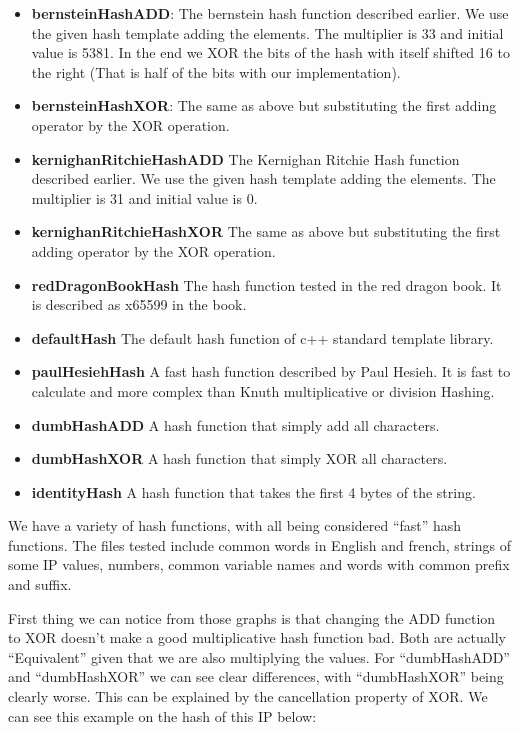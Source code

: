 \begin{itemize}
\item \textbf{bernsteinHashADD}: The bernstein hash function described earlier. We use the given hash template adding the elements. The multiplier is 33 and initial value is 5381. In the end we XOR the bits of the hash with itself shifted 16 to the right (That is half of the bits with our implementation).
  
\item \textbf{bernsteinHashXOR}: The same as above but substituting the first adding operator by the XOR operation.

\item \textbf{kernighanRitchieHashADD} The Kernighan Ritchie Hash function described earlier. We use the given hash template adding the elements. The multiplier is 31 and initial value is 0.

\item \textbf{kernighanRitchieHashXOR} The same as above but substituting the first adding operator by the XOR operation.

\item \textbf{redDragonBookHash} The hash function tested in the red dragon book. It is described as x65599 in the book.

\item \textbf{defaultHash} The default hash function of c++ standard template library.

\item \textbf{paulHesiehHash} A fast hash function described by Paul Hesieh. It is fast to calculate and more complex than Knuth multiplicative or division Hashing.
  
\item \textbf{dumbHashADD} A hash function that simply add all characters.

\item \textbf{dumbHashXOR} A hash function that simply XOR all characters.

\item \textbf{identityHash} A hash function that takes the first 4 bytes of the string.  
\end{itemize}

We have a variety of hash functions, with all being considered ``fast'' hash functions. The files tested include common words in English and french, strings of some IP values, numbers, common variable names and words with common prefix and suffix.

First thing we can notice from those graphs is that changing the ADD function to XOR doesn't make a good multiplicative hash function bad. Both are actually ``Equivalent'' given that we are also multiplying the values. For ``dumbHashADD'' and ``dumbHashXOR'' we can see clear differences, with ``dumbHashXOR'' being clearly worse. This can be explained by the cancellation property of XOR. We can see this example on the hash of this IP below:

